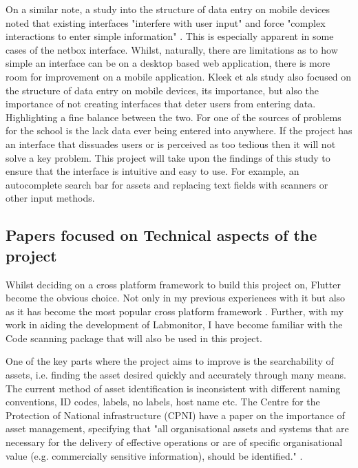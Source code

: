 \documentclass [11pt,letterpaper]{article}
\begin{document}
On a similar note, a study into the structure of data entry on mobile devices noted that existing interfaces "interfere with user input" and force "complex interactions to enter simple information" \cite{van2007gui}. This is especially apparent in some cases of the netbox interface. Whilst, naturally, there are limitations as to how simple an interface can be on a desktop based web application, there is more room for improvement on a mobile application. Kleek et als \cite{van2007gui} study also focused on the structure of data entry on mobile devices, its importance, but also the importance of not creating interfaces that deter users from entering data. Highlighting a fine balance between the two. For one of the sources of problems for the school is the lack data ever being entered into anywhere. If the project has an interface that dissuades users or is perceived as too tedious then it will not solve a key problem. This project will take upon the findings of this study to ensure that the interface is intuitive and easy to use. For example, an autocomplete search bar for assets and replacing text fields with scanners or other input methods. 

\subsection{Papers focused on Technical aspects of the project}
\label{sec:technical}

Whilst deciding on a cross platform framework to build this project on, Flutter become the obvious choice. Not only in my previous experiences with it but also as it has become the most popular cross platform framework \cite{JetBrainsFlutter}. Further, with my work in aiding the development of Labmonitor\cite{labmonitor}, I have become familiar with the Code scanning package that will also be used in this project\cite{barcodeScannerPlugin}.

One of the key parts where the project aims to improve is the searchability of assets, i.e. finding the asset desired quickly and accurately through many means. The current method of asset identification is inconsistent with different naming conventions, ID codes, labels, no labels, host name etc. The Centre for the Protection of National infrastructure (CPNI) have a paper on the importance of asset management, specifying that "all organisational assets and systems that are necessary for the delivery of effective operations or are of specific organisational value (e.g. commercially sensitive information), should be identified." \cite{cpni}.
\end{document}
